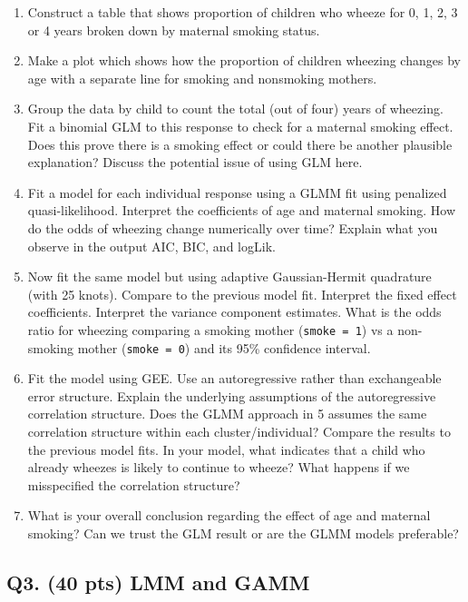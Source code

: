 \documentclass[
]{article}
\begin{document}
\begin{enumerate}
\def\labelenumi{\arabic{enumi}.}
\item
  Construct a table that shows proportion of children who wheeze for 0,
  1, 2, 3 or 4 years broken down by maternal smoking status.
\item
  Make a plot which shows how the proportion of children wheezing
  changes by age with a separate line for smoking and nonsmoking
  mothers.
\item
  Group the data by child to count the total (out of four) years of
  wheezing. Fit a binomial GLM to this response to check for a maternal
  smoking effect. Does this prove there is a smoking effect or could
  there be another plausible explanation? Discuss the potential issue of
  using GLM here.
\item
  Fit a model for each individual response using a GLMM fit using
  penalized quasi-likelihood. Interpret the coefficients of age and
  maternal smoking. How do the odds of wheezing change numerically over
  time? Explain what you observe in the output AIC, BIC, and logLik.
\item
  Now fit the same model but using adaptive Gaussian-Hermit quadrature
  (with 25 knots). Compare to the previous model fit. Interpret the
  fixed effect coefficients. Interpret the variance component estimates.
  What is the odds ratio for wheezing comparing a smoking mother
  (\texttt{smoke\ =\ 1}) vs a non-smoking mother (\texttt{smoke\ =\ 0})
  and its 95\% confidence interval.
\item
  Fit the model using GEE. Use an autoregressive rather than
  exchangeable error structure. Explain the underlying assumptions of
  the autoregressive correlation structure. Does the GLMM approach in 5
  assumes the same correlation structure within each cluster/individual?
  Compare the results to the previous model fits. In your model, what
  indicates that a child who already wheezes is likely to continue to
  wheeze? What happens if we misspecified the correlation structure?
\item
  What is your overall conclusion regarding the effect of age and
  maternal smoking? Can we trust the GLM result or are the GLMM models
  preferable?
\end{enumerate}

\hypertarget{q3.-40-pts-lmm-and-gamm}{%
\subsection{Q3. (40 pts) LMM and GAMM}\label{q3.-40-pts-lmm-and-gamm}}
\end{document}
